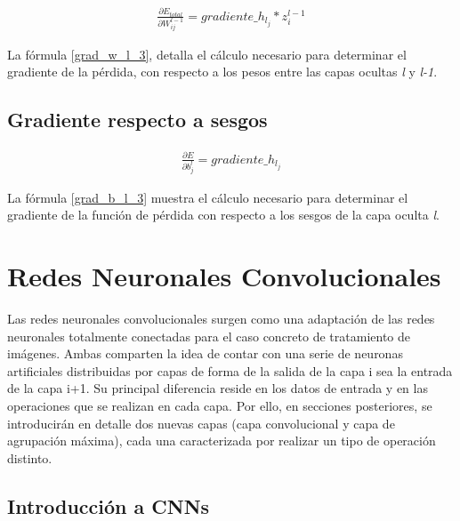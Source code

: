\begin{gather}
	\frac{\partial E_{total} }{\partial W^{l-1}_{ij} } = gradiente\_h_{l_j} * z^{l-1}_i \label{grad_w_l_3}
\end{gather}

La fórmula \ref{grad_w_l_3}, detalla el cálculo necesario para determinar el gradiente de la pérdida, con respecto a los pesos entre las capas ocultas \textit{l} y \textit{l-1}.

\subsection{Gradiente respecto a sesgos}

\begin{gather}
	\frac{\partial E}{\partial b^l_j} = gradiente\_h_{l_j} \label{grad_b_l_3}
\end{gather}

La fórmula \ref{grad_b_l_3} muestra el cálculo necesario para determinar el gradiente de la función de pérdida con respecto a los sesgos de la capa oculta \textit{l}.



\section{Redes Neuronales Convolucionales}

Las redes neuronales convolucionales \cite{CNN_definicion} surgen como una adaptación de las redes neuronales totalmente conectadas para el caso concreto de tratamiento de imágenes. Ambas comparten la idea de contar con una serie de neuronas artificiales distribuidas por capas de forma de la salida de la capa i sea la entrada de la capa i+1. Su principal diferencia reside en los datos de entrada y en las operaciones que se realizan en cada capa. Por ello, en secciones posteriores, se introducirán en detalle dos nuevas capas (capa convolucional y capa de agrupación máxima), cada una caracterizada por realizar un tipo de operación distinto.

\subsection{Introducción a CNNs \label{intro_CNN}}

